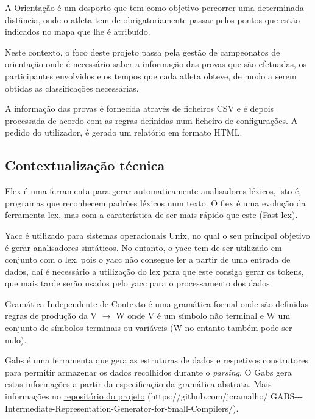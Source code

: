 \documentclass[11pt, a4paper, oneside]{article}
\begin{document}
A Orientação é um desporto que tem como objetivo percorrer uma determinada distância, onde o atleta tem de obrigatoriamente passar pelos pontos que estão indicados no mapa que lhe é atribuído.

Neste contexto, o foco deste projeto passa pela gestão de campeonatos de orientação onde é necessário saber a informação das provas que são efetuadas, os participantes envolvidos e os tempos que cada atleta obteve, de modo a serem obtidas as classificações necessárias.

A informação das provas é fornecida através de ficheiros CSV e é depois processada de acordo com as regras definidas num ficheiro de configurações. A pedido do utilizador, é gerado um relatório em formato HTML.

\subsection{Contextualização técnica}

\textsf{Flex} é uma ferramenta para gerar automaticamente analisadores léxicos, isto é, programas que reconhecem padrões léxicos num texto. O \textsf{flex} é uma evolução da ferramenta \textsf{lex}, mas com a caraterística de ser mais rápido que este (\textsf{Fast lex}).

\textsf{Yacc} é utilizado para sistemas operacionais \textsf{Unix}, no qual o seu principal objetivo é gerar analisadores sintáticos. No entanto, o \textsf{yacc} tem de ser utilizado em conjunto com o \textsf{lex}, pois o \textsf{yacc} não consegue ler a partir de uma entrada de dados, daí é necessário a utilização do \textsf{lex} para que este consiga gerar os tokens, que mais tarde serão usados pelo \textsf{yacc} para o processamento dos dados.

Gramática Independente de Contexto é uma gramática formal onde são definidas regras de produção da V $\rightarrow$ W onde V é um símbolo não terminal e W um conjunto de símbolos terminais ou variáveis (W no entanto também pode ser nulo).

\textsf{Gabs} é uma ferramenta que gera as estruturas de dados e respetivos construtores para permitir armazenar os dados recolhidos durante o \emph{parsing}. O \textsf{Gabs} gera estas informações a partir da especificação da gramática abstrata. Mais informações no \href{https://github.com/jcramalho/GABS---Intermediate-Representation-Generator-for-Small-Compilers/}{repositório do projeto} (https://github.com/jcramalho/ GABS-{-}-Intermediate-Representation-Generator-for-Small-Compilers/).
\end{document}
